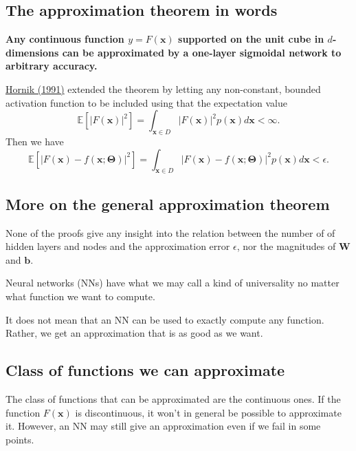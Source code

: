 \documentclass[%
oneside,                 %
final,                   %
10pt]{article}
\begin{document}
\subsection{The approximation theorem in words}

\textbf{Any continuous function $y=F(\bm{x})$ supported on the unit cube in
$d$-dimensions can be approximated by a one-layer sigmoidal network to
arbitrary accuracy.}

\href{{https://www.sciencedirect.com/science/article/abs/pii/089360809190009T}}{Hornik (1991)} extended the theorem by letting any non-constant, bounded activation function to be included using that the expectation value
\[
\mathbb{E}[\vert F(\bm{x})\vert^2] =\int_{\bm{x}\in D} \vert F(\bm{x})\vert^2p(\bm{x})d\bm{x} < \infty.
\]
Then we have
\[
\mathbb{E}[\vert F(\bm{x})-f(\bm{x};\bm{\Theta})\vert^2] =\int_{\bm{x}\in D} \vert F(\bm{x})-f(\bm{x};\bm{\Theta})\vert^2p(\bm{x})d\bm{x} < \epsilon.
\]

\subsection{More on the general approximation theorem}

None of the proofs give any insight into the relation between the
number of of hidden layers and nodes and the approximation error
$\epsilon$, nor the magnitudes of $\bm{W}$ and $\bm{b}$.

Neural networks (NNs) have what we may call a kind of universality no matter what function we want to compute.

\begin{block}{}
It does not mean that an NN can be used to exactly compute any function. Rather, we get an approximation that is as good as we want. 
\end{block}

\subsection{Class of functions we can approximate}

\begin{block}{}
The class of functions that can be approximated are the continuous ones.
If the function $F(\bm{x})$ is discontinuous, it won't in general be possible to approximate it. However, an NN may still give an approximation even if we fail in some points.
\end{block}

\end{document}
